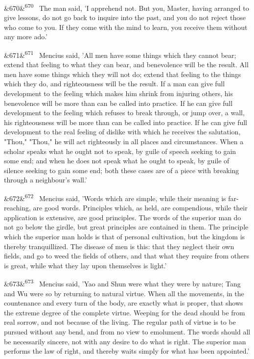 \documentclass[12pt]{article}
\newcommand{\para}[1][]{\par\noindent\ifx&#1&\else\textsuperscript{\footnotesize #1}~\fi}
\begin{document}
\para[670] The man said, 'I apprehend not. But you, Master, having arranged to give lessons, do not go back to inquire into the past, and you do not reject those who come to you. If they come with the mind to learn, you receive them without any more ado.'

\para[671] Mencius said, 'All men have some things which they cannot bear; extend that feeling to what they can bear, and benevolence will be the result. All men have some things which they will not do; extend that feeling to the things which they do, and righteousness will be the result. If a man can give full development to the feeling which makes him shrink from injuring others, his benevolence will be more than can be called into practice. If he can give full development to the feeling which refuses to break through, or jump over, a wall, his righteousness will be more than can be called into practice. If he can give full development to the real feeling of dislike with which he receives the salutation, "Thou," "Thou," he will act righteously in all places and circumstances. When a scholar speaks what he ought not to speak, by guile of speech seeking to gain some end; and when he does not speak what he ought to speak, by guile of silence seeking to gain some end; both these cases are of a piece with breaking through a neighbour's wall.'

\para[672] Mencius said, 'Words which are simple, while their meaning is far-reaching, are good words. Principles which, as held, are compendious, while their application is extensive, are good principles. The words of the superior man do not go below the girdle, but great principles are contained in them. The principle which the superior man holds is that of personal cultivation, but the kingdom is thereby tranquillized. The disease of men is this: that they neglect their own fields, and go to weed the fields of others, and that what they require from others is great, while what they lay upon themselves is light.'

\para[673] Mencius said, 'Yao and Shun were what they were by nature; Tang and Wu were so by returning to natural virtue. When all the movements, in the countenance and every turn of the body, are exactly what is proper, that shows the extreme degree of the complete virtue. Weeping for the dead should be from real sorrow, and not because of the living. The regular path of virtue is to be pursued without any bend, and from no view to emolument. The words should all be necessarily sincere, not with any desire to do what is right. The superior man performs the law of right, and thereby waits simply for what has been appointed.'
\end{document}
